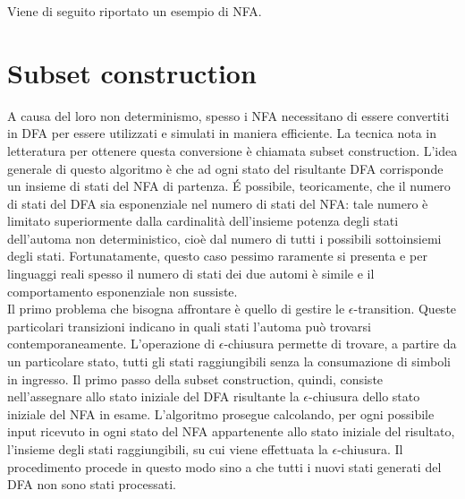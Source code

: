 \begin{ex}
Viene di seguito riportato un esempio di NFA.
\end{ex}

\newpage
\section{Subset construction}
A causa del loro non determinismo, spesso i NFA necessitano di essere convertiti in DFA per essere utilizzati e simulati in maniera efficiente. La tecnica nota in letteratura per ottenere questa conversione è chiamata subset construction.
L'idea generale di questo algoritmo è che ad ogni stato del risultante DFA corrisponde un insieme di stati del NFA di partenza.
\'E possibile, teoricamente, che il numero di stati del DFA sia esponenziale nel numero di stati del NFA: tale numero è limitato superiormente dalla cardinalità dell'insieme potenza degli stati dell'automa non deterministico, cioè dal numero di tutti i possibili sottoinsiemi degli stati.
Fortunatamente, questo caso pessimo raramente si presenta e per linguaggi reali spesso il numero di stati dei due automi è simile e il comportamento esponenziale non sussiste.\\
Il primo problema che bisogna affrontare è quello di gestire le $\epsilon$-transition. Queste particolari transizioni indicano in quali stati l'automa può trovarsi contemporaneamente. L'operazione di $\epsilon$-chiusura permette di trovare, a partire da un particolare stato, tutti gli stati raggiungibili senza la consumazione di simboli in ingresso. Il primo passo della subset construction, quindi, consiste nell'assegnare allo stato iniziale del DFA risultante la $\epsilon$-chiusura dello stato iniziale del NFA in esame. L'algoritmo prosegue calcolando, per ogni possibile input ricevuto in ogni stato del NFA appartenente allo stato iniziale del risultato, l'insieme degli stati raggiungibili, su cui viene effettuata la $\epsilon$-chiusura. Il procedimento procede in questo modo sino a che tutti i nuovi stati generati del DFA non sono stati processati.

\newpage
